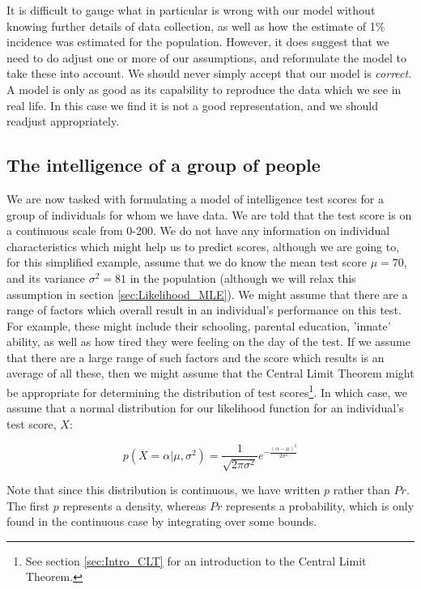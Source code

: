 \documentclass[11pt,fullpage]{book}
\begin{document}
It is difficult to gauge what in particular is wrong with our model without knowing further details of data collection, as well as how the estimate of 1\% incidence was estimated for the population. However, it does suggest that we need to do adjust one or more of our assumptions, and reformulate the model to take these into account. We should never simply accept that our model is \textit{correct}. A model is only as good as its capability to reproduce the data which we see in real life. In this case we find it is not a good representation, and we should readjust appropriately.

\subsection{The intelligence of a group of people}\label{sec:Likelihood_normal}
We are now tasked with formulating a model of intelligence test scores for a group of individuals for whom we have data. We are told that the test score is on a continuous scale from 0-200. We do not have any information on individual characteristics which might help us to predict scores, although we are going to, for this simplified example, assume that we do know the mean test score $\mu=70$, and its variance $\sigma^2=81$ in the population (although we will relax this assumption in section \ref{sec:Likelihood_MLE}). We might assume that there are a range of factors which overall result in an individual's performance on this test. For example, these might include their schooling, parental education, 'innate' ability, as well as how tired they were feeling on the day of the test. If we assume that there are a large range of such factors and the score which results is an average of all these, then we might assume that the Central Limit Theorem might be appropriate for determining the distribution of test scores\footnote{See section \ref{sec:Intro_CLT} for an introduction to the Central Limit Theorem.}. In which case, we assume that a normal distribution for our likelihood function for an individual's test score, $X$:

\begin{equation}
p(X=\alpha|\mu,\sigma^2) = \frac{1}{\sqrt{2\pi\sigma^2}}e^{-\frac{(\alpha-\mu)^2}{2\sigma^2}}
\end{equation}\label{eq:Likelihood_normal}

Note that since this distribution is continuous, we have written $p$ rather than $Pr$. The first $p$ represents a density, whereas $Pr$ represents a probability, which is only found in the continuous case by integrating over some bounds.
\end{document}
